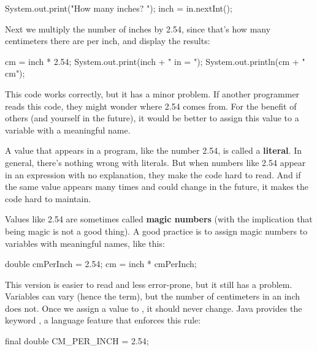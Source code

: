 \begin{code}
System.out.print("How many inches? ");
inch = in.nextInt();
\end{code}

Next we multiply the number of inches by 2.54, since that's how many centimeters there are per inch, and display the results:

\begin{code}
cm = inch * 2.54;
System.out.print(inch + " in = ");
System.out.println(cm + " cm");
\end{code}

This code works correctly, but it has a minor problem.
If another programmer reads this code, they might wonder where 2.54 comes from.
For the benefit of others (and yourself in the future), it would be better to assign this value to a variable with a meaningful name.




A value that appears in a program, like the number 2.54, is called a {\bf literal}.
In general, there's nothing wrong with literals.
But when numbers like 2.54 appear in an expression with no explanation, they make the code hard to read.
And if the same value appears many times and could change in the future, it makes the code hard to maintain.


Values like 2.54 are sometimes called {\bf magic numbers} (with the implication that being magic is not a good thing).
A good practice is to assign magic numbers to variables with meaningful names, like this:

\begin{code}
double cmPerInch = 2.54;
cm = inch * cmPerInch;
\end{code}

This version is easier to read and less error-prone, but it still has a problem.
Variables can vary (hence the term), but the number of centimeters in an inch does not.
Once we assign a value to , it should never change.
Java provides the keyword , a language feature that enforces this rule:

\begin{code}
final double CM_PER_INCH = 2.54;
\end{code}

